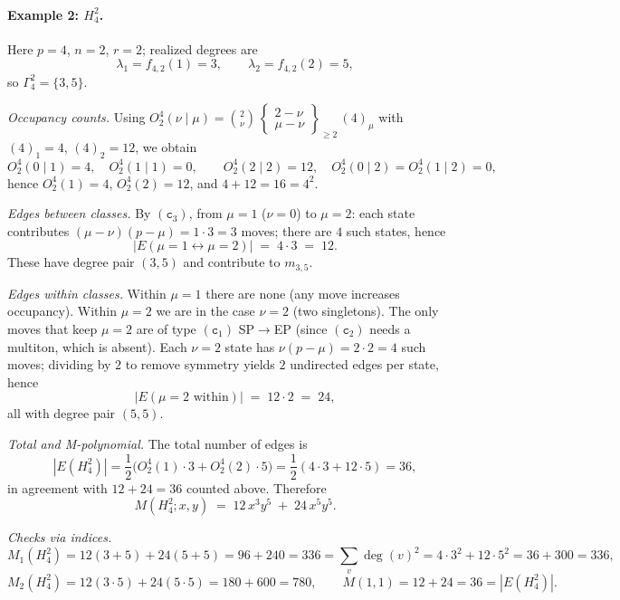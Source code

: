 \documentclass[letterpaper,12pt]{article}
\begin{document}
\paragraph{Example 2: $H_4^2$.}
Here $p=4$, $n=2$, $r=2$; realized degrees are
\[
\lambda_1=f_{4,2}(1)=3,\qquad \lambda_2=f_{4,2}(2)=5,
\]
so $\Gamma_4^2=\{3,5\}$.

\emph{Occupancy counts.}
Using $O_2^4(\nu\mid\mu)=\binom{2}{\nu}\,
\begin{Bmatrix} 2-\nu \\ \mu-\nu \end{Bmatrix}_{\ge 2}\,(4)_\mu$ with
$(4)_1=4$, $(4)_2=12$, we obtain
\[
O_2^4(0\mid 1)=4,\quad O_2^4(1\mid 1)=0,\qquad
O_2^4(2\mid 2)=12,\quad O_2^4(0\mid 2)=O_2^4(1\mid 2)=0,
\]
hence $O_2^4(1)=4$, $O_2^4(2)=12$, and $4+12=16=4^2$.

\emph{Edges between classes.}
By $(\texttt{c}_{3})$, from $\mu=1$ ($\nu=0$) to $\mu=2$:
each state contributes $(\mu-\nu)(p-\mu)=1\cdot 3=3$ moves; there are $4$ such states, hence
\[
|E(\mu=1\leftrightarrow \mu=2)| \;=\; 4\cdot 3 \;=\; 12.
\]
These have degree pair $(3,5)$ and contribute to $m_{3,5}$.

\emph{Edges within classes.}
Within $\mu=1$ there are none (any move increases occupancy).
Within $\mu=2$ we are in the case $\nu=2$ (two singletons). The only moves that keep $\mu=2$
are of type $(\texttt{c}_{1})$ SP$\to$EP (since $(\texttt{c}_{2})$ needs a multiton, which is absent).
Each $\nu=2$ state has $\nu(p-\mu)=2\cdot 2=4$ such moves; dividing by $2$ to remove symmetry
yields $2$ undirected edges per state, hence
\[
|E(\mu=2 \text{ within})| \;=\; 12\cdot 2 \;=\; 24,
\]
all with degree pair $(5,5)$.

\emph{Total and M-polynomial.}
The total number of edges is
\[
|E(H_4^2)|=\frac12\big( O_2^4(1)\cdot 3 + O_2^4(2)\cdot 5\big)
=\frac12(4\cdot 3+12\cdot 5)=36,
\]
in agreement with $12+24=36$ counted above.
Therefore
\[
M(H_4^2;x,y)\;=\;12\,x^3y^5\;+\;24\,x^5y^5.
\]

\emph{Checks via indices.}
\[
M_1(H_4^2)=12(3+5)+24(5+5)=96+240=336
=\sum_{v}\deg(v)^2=4\cdot 3^2+12\cdot 5^2=36+300=336,
\]
\[
M_2(H_4^2)=12(3\cdot 5)+24(5\cdot 5)=180+600=780,
\qquad
M(1,1)=12+24=36=|E(H_4^2)|.
\]
\end{document}
